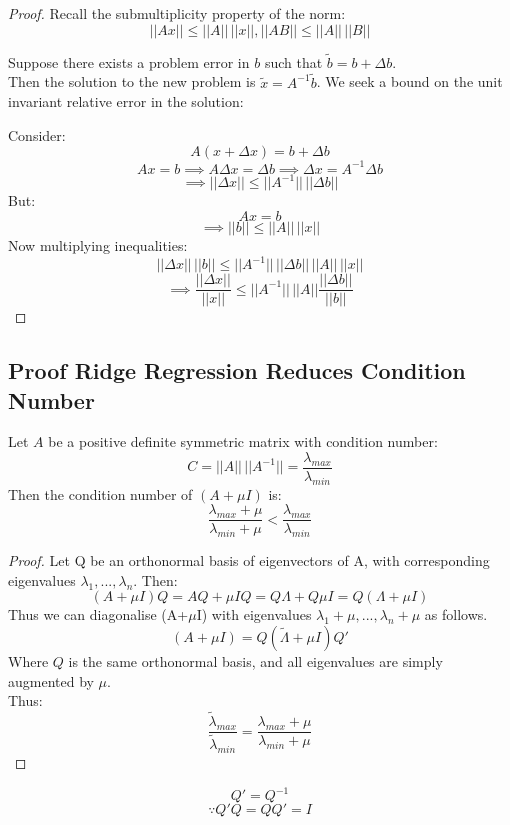 \documentclass[DIV=14,titlepage=false]{scrreprt}
\begin{document}
\begin{proof}

Recall the submultiplicity property of the norm:
\[||Ax||\leq||A||\,||x||, ||AB||\leq||A||\,||B||\]

Suppose there exists a problem error in \(b\) such that \(\tilde{b}=b+\Delta b\).
\\ Then the solution to the new problem is \(\tilde{x}=A^{-1}\tilde{b}\). We seek a bound on the unit invariant relative error in the solution:

Consider:
\[A(x+\Delta x)=b+\Delta b\]
\[Ax=b\implies A\Delta x=\Delta b \implies \Delta x=A^{-1} \Delta b\]
\[\implies ||\Delta x||\leq||A^{-1}||\,||\Delta b||\]
But:
\[Ax=b\]
\[\implies ||b||\leq||A||\,||x||\]
Now multiplying inequalities:
\[||\Delta x||\,||b||\leq||A^{-1}||\,||\Delta b||\,||A||\,||x||\]
\[\implies \frac{||\Delta x||}{||x||}\leq||A^{-1}||\,||A||\frac{||\Delta b||}{||b||}\]
\end{proof}

\subsection{Proof Ridge Regression Reduces Condition Number}
\vspace{5mm}
\begin{theorem}
    Let \(A\) be a positive definite symmetric matrix with condition number:
    \[C=||A||\,||A^{-1}||=\frac{\lambda_{max}}{\lambda_{min}}\]
    Then the condition number of \((A+\mu I)\) is:
    \[\frac{\lambda_{max}+\mu}{\lambda_{min}+\mu}<\frac{\lambda_{max}}{\lambda_{min}}\]
\end{theorem}
\vspace{5mm}
\begin{proof}
    Let Q be an orthonormal basis of eigenvectors of A, with corresponding eigenvalues \(\lambda_1,...,\lambda_n\). Then:
    \[(A+\mu I)Q=AQ + \mu IQ=Q\Lambda + Q\mu I=Q(\Lambda + \mu I)\]
    Thus we can diagonalise (A+\(\mu\)I) with eigenvalues \(\lambda_1+\mu,...,\lambda_n+\mu\) as follows.
    \[(A+\mu I)=Q(\tilde{\Lambda} + \mu I)Q'\]
    Where \(Q\) is the same orthonormal basis, and all eigenvalues are simply augmented by \(\mu\).
    \\Thus: \[\frac{\tilde{\lambda}_{max}}{\tilde{\lambda}_{min}}=\frac{\lambda_{max} + \mu}{\lambda_{min} + \mu}\]
\end{proof}

\begin{note}
    \[Q'=Q^{-1}\]
    \[\because Q'Q=QQ'=I\]
\end{note}
\end{document}
